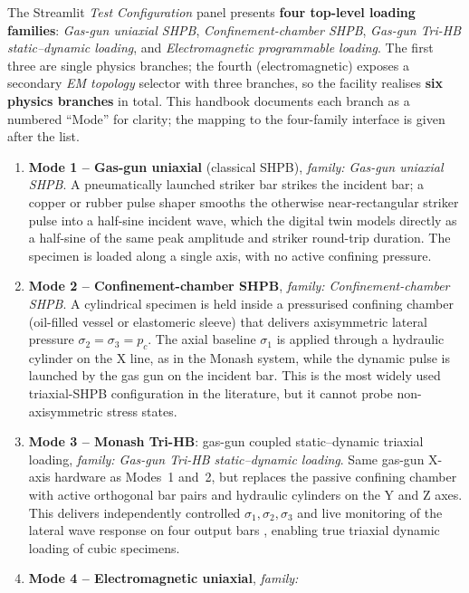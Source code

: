 \documentclass[11pt,a4paper,openany]{book}
\theoremstyle{handbook}
\newcommand{\sig}{\sigma}
\begin{document}
The Streamlit \emph{Test Configuration} panel presents \textbf{four top-level
loading families}: \emph{Gas-gun uniaxial SHPB}, \emph{Confinement-chamber
SHPB}, \emph{Gas-gun Tri-HB static--dynamic loading}, and
\emph{Electromagnetic programmable loading}. The first three are single
physics branches; the fourth (electromagnetic) exposes a secondary
\emph{EM topology} selector with three branches, so the facility realises
\textbf{six physics branches} in total. This handbook documents each branch as
a numbered ``Mode'' for clarity; the mapping to the four-family interface is
given after the list.

\begin{enumerate}[leftmargin=2.4em,itemsep=4pt]
\item \textbf{Mode 1 -- Gas-gun uniaxial} (classical SHPB), \emph{family:
      Gas-gun uniaxial SHPB}. A pneumatically
      launched striker bar strikes the incident bar; a copper or rubber pulse
      shaper smooths the otherwise near-rectangular striker pulse into a
      half-sine incident wave, which the digital twin models directly as a
      half-sine of the same peak amplitude and striker round-trip duration.
      The specimen is loaded along a single axis, with no active confining
      pressure.
\item \textbf{Mode 2 -- Confinement-chamber SHPB}, \emph{family:
      Confinement-chamber SHPB}. A cylindrical specimen
      is held inside a pressurised confining chamber (oil-filled vessel or
      elastomeric sleeve) that delivers axisymmetric lateral pressure
      $\sig_2=\sig_3=p_c$. The axial baseline $\sig_1$ is applied through
      a hydraulic cylinder on the X line, as in the Monash system, while
      the dynamic pulse is launched by the gas gun on the incident bar.
      This is the most widely used triaxial-SHPB configuration in the
      literature, but it cannot probe non-axisymmetric stress states.
\item \textbf{Mode 3 -- Monash Tri-HB}: gas-gun coupled static--dynamic
      triaxial loading, \emph{family: Gas-gun Tri-HB static--dynamic loading}.
      Same gas-gun X-axis hardware as Modes~1 and~2, but
      replaces the passive confining chamber with active orthogonal bar
      pairs and hydraulic cylinders on the Y and Z axes. This delivers
      independently controlled $\sig_1,\sig_2,\sig_3$ and live monitoring
      of the lateral wave response on four output bars
      \cite{Liu2019,Zhang2019Tri}, enabling true triaxial dynamic loading
      of cubic specimens.
\item \textbf{Mode 4 -- Electromagnetic uniaxial}, \emph{family:
}
\end{enumerate}
\end{document}
